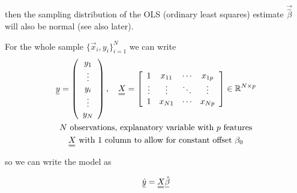 then the sampling distribution of the OLS (ordinary least squares) estimate $\vec{\hat{\beta}}$ will also be normal (see also later).


For the whole sample $\{ \vec{x}_i,y_i \}_{i=1}^N$ we can write
\begin{equation}
 \begin{gathered}
    \vec{y}=\left(\begin{array}{c}
        y_1 \\
        \vdots \\
        y_i \\
        \vdots \\
        y_N
        \end{array}\right), \quad \mat{X}=\left[\begin{array}{cccc}
        1 & x_{11} & \cdots & x_{1 p} \\
        \vdots & \vdots & \ddots & \vdots \\
        1 & x_{N 1} & \cdots & x_{N p}
    \end{array}\right] \in \mathbb{R}^{N \times p} \\
    N \text{ observations, explanatory variable with } p \text{ features} \\
    \mat{X} \text{ with 1 column to allow for constant offset } \beta_0
 \end{gathered}
\end{equation}

so we can write the model as

\begin{equation}
    \vec{\hat{y}}=\mat{X} \vec{\hat{\beta}}
\end{equation}


